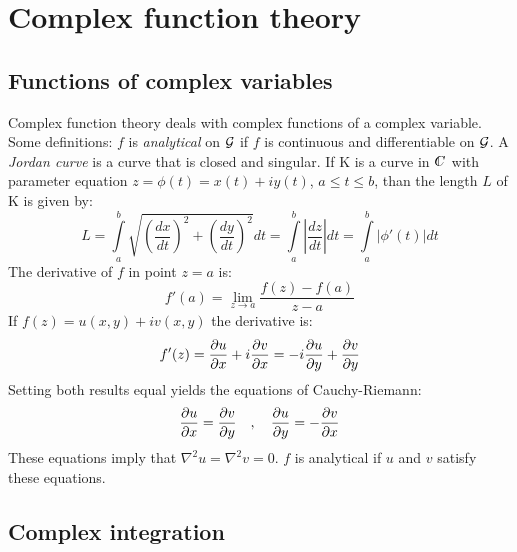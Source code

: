 \documentclass[a4paper,fancyheadings,twoside]{report}
\begin{document}
\chapter{Complex function theory}
\section{Functions of complex variables}
Complex function theory deals with complex functions of a complex variable.
Some definitions:
\npar
$f$ is {\it analytical} on $\cal G$ if $f$ is continuous and differentiable
on $\cal G$.
\npar
A {\it Jordan curve} is a curve that is closed and singular.
\npar
If K is a curve in $\CC$ with parameter equation $z=\phi(t)=x(t)+iy(t)$,
$a\leq t\leq b$, than the length $L$ of K is given by:
\[
L=\int\limits_a^b \sqrt{\left(\frac{dx}{dt}\right)^2+\left(\frac{dy}{dt}\right)^2}dt=
\int\limits_a^b\left|\frac{dz}{dt}\right|dt=\int\limits_a^b|\phi'(t)|dt
\]
The derivative of $f$ in point $z=a$ is:
\[
f'(a)=\lim_{z\rightarrow a}\frac{f(z)-f(a)}{z-a}
\]
If $f(z)=u(x,y)+iv(x,y)$ the derivative is:
\[
f'(z)=\frac{\partial u}{\partial x}+i\frac{\partial v}{\partial x}=-i\frac{\partial u}{\partial y}+\frac{\partial v}{\partial y}
\]
Setting both results equal yields the equations of Cauchy-Riemann:
\[
\frac{\partial u}{\partial x}=\frac{\partial v}{\partial y}~~~,~~~\frac{\partial u}{\partial y}=-\frac{\partial v}{\partial x}
\]
These equations imply that $\nabla^2u=\nabla^2v=0$.
$f$ is analytical if $u$ and $v$ satisfy these equations.

\section{Complex integration}
\end{document}
